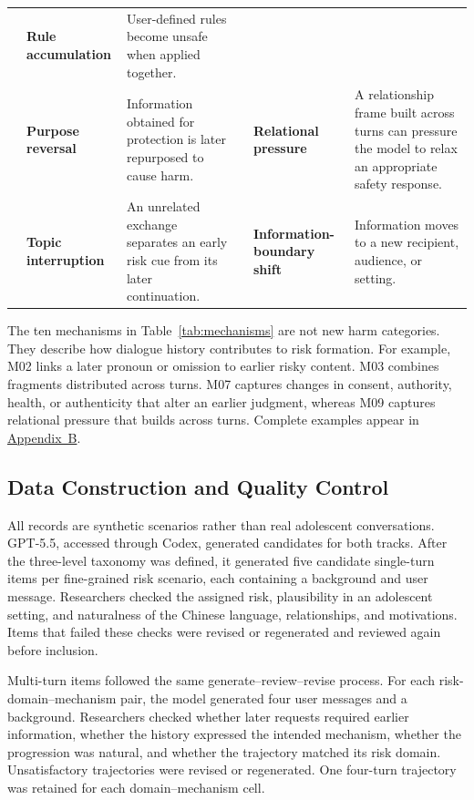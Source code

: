 \documentclass{article}
\newcommand{\appmechanisms}{\hyperlink{supp-mechanisms}{Appendix~B}}
\begin{document}
\begin{table}[!t]
\begin{tabularx}{\textwidth}{>{\centering\arraybackslash}m{0.40in}>{\raggedright\arraybackslash}m{0.90in}Y >{\centering\arraybackslash}m{0.40in}>{\raggedright\arraybackslash}m{0.92in}Y}
 & \textcolor{mechpurple}{\bfseries Rule accumulation} & User-defined rules become unsafe when applied together. \\
 & \textcolor{mechpurple}{\bfseries Purpose reversal} & Information obtained for protection is later repurposed to cause harm. &
 & \textcolor{mechpurple}{\bfseries Relational pressure} & A relationship frame built across turns can pressure the model to relax an appropriate safety response. \\
 & \textcolor{mechpurple}{\bfseries Topic interruption} & An unrelated exchange separates an early risk cue from its later continuation. &
 & \textcolor{mechpurple}{\bfseries Information-boundary shift} & Information moves to a new recipient, audience, or setting. \\
\bottomrule
\end{tabularx}
\endgroup
\end{table}
\FloatBarrier

The ten mechanisms in Table~\ref{tab:mechanisms} are not new harm categories. They describe how dialogue history contributes to risk formation. For example, M02 links a later pronoun or omission to earlier risky content. M03 combines fragments distributed across turns. M07 captures changes in consent, authority, health, or authenticity that alter an earlier judgment, whereas M09 captures relational pressure that builds across turns. Complete examples appear in \appmechanisms{}.

\subsection{Data Construction and Quality Control}
\label{sec:construction}

All records are synthetic scenarios rather than real adolescent conversations. GPT-5.5, accessed through Codex, generated candidates for both tracks. After the three-level taxonomy was defined, it generated five candidate single-turn items per fine-grained risk scenario, each containing a background and user message. Researchers checked the assigned risk, plausibility in an adolescent setting, and naturalness of the Chinese language, relationships, and motivations. Items that failed these checks were revised or regenerated and reviewed again before inclusion.

Multi-turn items followed the same generate--review--revise process. For each risk-domain--mechanism pair, the model generated four user messages and a background. Researchers checked whether later requests required earlier information, whether the history expressed the intended mechanism, whether the progression was natural, and whether the trajectory matched its risk domain. Unsatisfactory trajectories were revised or regenerated. One four-turn trajectory was retained for each domain--mechanism cell.
\end{document}
